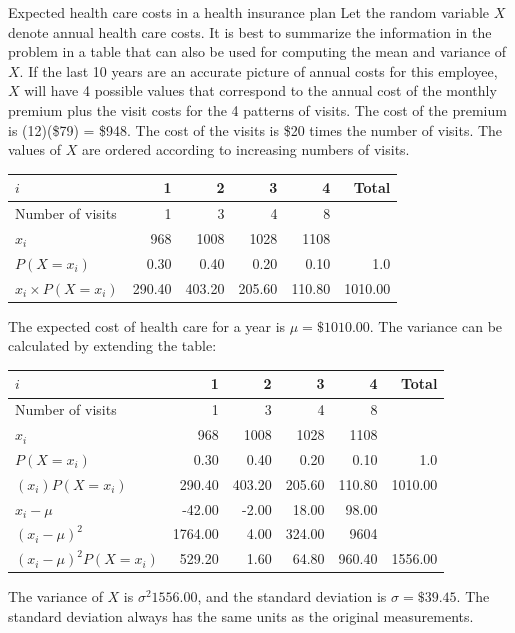 \begin{doublespace}
\begin{example}{Expected health care costs in a health insurance plan}
Let the random variable $X$ denote annual health care costs.  It is best to summarize the information in the problem in a table that can also be used for computing the mean and variance of $X$.  If the  last 10 years are an accurate picture of annual costs for this employee, $X$ will have 4 possible values that correspond to the annual cost of the monthly premium plus the visit costs for the 4 patterns of visits.  The cost of the premium is (12)(\$79) = \$948. The cost of the visits is \$20 times the number of visits.  The values of $X$ are ordered according to increasing numbers of visits. 
\begin{center}
\begin{tabular}{l rrrr r}
\hline
$i$ & 1 & 2 & 3 & 4 & Total \\
\hline
Number of visits & 1 & 3 & 4 & 8 &\\
$x_i$ & 968 & 1008 & 1028 & 1108 &  \\
$P(X=x_i)$ & 0.30 & 0.40 & 0.20 & 0.10 & 1.0 \\
$x_i \times  P(X=x_i)$ & 290.40 & 403.20 & 205.60 & 110.80 & 1010.00 \\
\hline
\end{tabular}
\end{center}
The expected cost of health care for a year is $\mu=\$1010.00$. The variance can be calculated by extending the table:
\begin{center}
\begin{tabular}{l rrrr r}
\hline
$i$ & 1 & 2 & 3 & 4 & Total \\
\hline
Number of visits & 1 & 3 & 4 & 8 &\\
$x_i$ & 968 & 1008 & 1028 & 1108 &  \\
$P(X=x_i)$ & 0.30 & 0.40 & 0.20 & 0.10 & 1.0 \\
$(x_i)P(X=x_i)$ & 290.40 & 403.20 & 205.60 & 110.80 & 1010.00 \\
$x_i - \mu$ & -42.00  & -2.00  & 18.00  & 98.00 & \\
$(x_i - \mu)^2$ &  1764.00 & 4.00  & 324.00  & 9604 & \\
$(x_i - \mu)^2 P(X=x_i)$ & 529.20  & 1.60  & 64.80  & 960.40 & 1556.00\\
\hline
\end{tabular}
\end{center}
The variance of $X$ is $\sigma^2 1556.00$, and the standard deviation is $\sigma = \$39.45$.  The standard deviation always has the same units as the original measurements. 
\end{example}


\end{doublespace}
